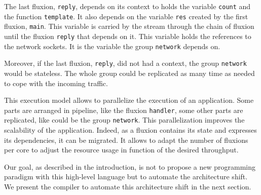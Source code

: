 The last fluxion, \texttt{reply}, depends on its context to holds the variable \texttt{count} and the function \texttt{template}.
It also depends on the variable \texttt{res} created by the first fluxion, \texttt{main}.
This variable is carried by the stream through the chain of fluxion until the fluxion \texttt{reply} that depends on it.
This variable holds the references to the network sockets.
It is the variable the group \texttt{network} depends on.

Moreover, if the last fluxion, \texttt{reply}, did not had a context, the group \texttt{network} would be stateless.
The whole group could be replicated as many time as needed to cope with the incoming traffic.

This execution model allows to parallelize the execution of an application.
Some parts are arranged in pipeline, like the fluxion \texttt{handler}, some other parts are replicated, like could be the group \texttt{network}.
This parallelization improves the scalability of the application.
Indeed, as a fluxion contains its state and expresses its dependencies, it can be migrated.
It allows to adapt the number of fluxions per core to adjust the resource usage in function of the desired throughput.



Our goal, as described in the introduction, is not to propose a new programming paradigm with this high-level language but to automate the architecture shift.
We present the compiler to automate this architecture shift in the next section.